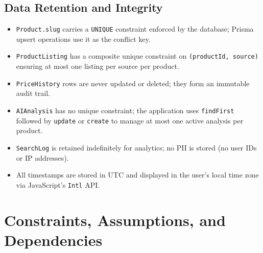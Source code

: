 \documentclass[12pt,a4paper]{report}
\begin{document}
\section{Data Retention and Integrity}
\begin{itemize}[noitemsep]
  \item \texttt{Product.slug} carries a \texttt{UNIQUE} constraint enforced
        by the database; Prisma upsert operations use it as the conflict key.
  \item \texttt{ProductListing} has a composite unique constraint on
        \texttt{(productId, source)} ensuring at most one listing per source
        per product.
  \item \texttt{PriceHistory} rows are never updated or deleted; they form
        an immutable audit trail.
  \item \texttt{AIAnalysis} has no unique constraint; the application uses
        \texttt{findFirst} followed by \texttt{update} or \texttt{create} to
        manage at most one active analysis per product.
  \item \texttt{SearchLog} is retained indefinitely for analytics; no
        PII is stored (no user IDs or IP addresses).
  \item All timestamps are stored in UTC and displayed in the user's local
        time zone via JavaScript's \texttt{Intl} API.
\end{itemize}

\chapter{Constraints, Assumptions, and Dependencies}
\end{document}
